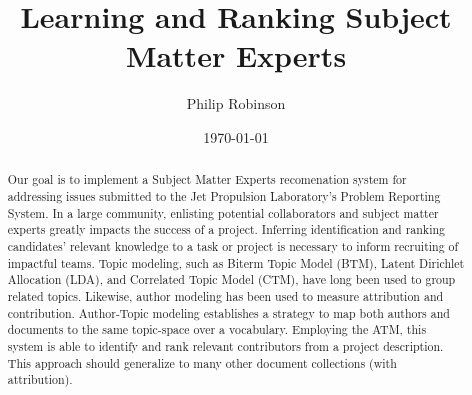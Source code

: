 \documentclass{article}
\title{Learning and Ranking Subject Matter Experts}
\date{\today}
\author{Philip Robinson}
\affil{NASA: Jet Propulsion Laboratory}
\begin{document}
\maketitle

\begin{abstract}
  Our goal is to implement a Subject Matter Experts recomenation system for addressing issues
  submitted to the Jet Propulsion Laboratory's Problem Reporting System.
  In a large community, enlisting potential collaborators and subject matter experts
  greatly impacts the success of a project. Inferring identification and ranking
  candidates' relevant knowledge to a task or project is necessary to inform recruiting
  of impactful teams\cite{Minto2007}.
  Topic modeling, such as Biterm Topic Model (BTM)\cite{Yan2013,Chen2015}, Latent Dirichlet Allocation (LDA),
  and Correlated Topic Model (CTM), have long been used to group related topics\cite{Alghamdi2015}. Likewise,
  author modeling has been used to measure attribution\cite{Rexha2018} and
  contribution\cite{AldebeiHJ016}. Author-Topic modeling establishes a strategy to
  map both authors and documents to the same topic-space over a vocabulary\cite{RosenZvi2004}.
  Employing the ATM, this system is able to identify and rank relevant contributors
  from a project description. This approach should generalize to many other document
  collections (with attribution).
\end{abstract}

\end{document}
